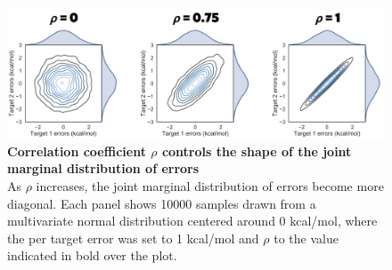 \documentclass[9pt,lineno]{elife-modified} %
\begin{document}
\begin{figure}[h]
\begin{fullwidth}
\begin{centering}
\includegraphics[width=1.0\linewidth]{figures/supp_2.png}
\end{centering}
\caption{
\label{fig:sup-figure-2}
{\bf Correlation coefficient $\rho$ controls the shape of the joint marginal distribution of errors} \\
As $\rho$ increases, the joint marginal distribution of errors become more diagonal. Each panel shows 10000 samples drawn from a multivariate normal distribution centered around 0 kcal/mol, where the per target error was set to 1 kcal/mol and $\rho$ to the value indicated in bold over the plot. 
}
\end{fullwidth}
\end{figure}
\end{document}
